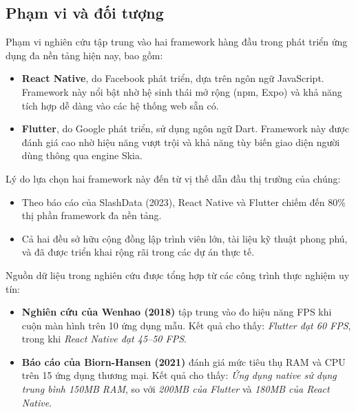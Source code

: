 \subsection{Phạm vi và đối tượng}
\renewcommand{\labelitemi}{--}    
\begin{flushleft}
    \hspace*{0.8cm}Phạm vi nghiên cứu tập trung vào hai framework hàng đầu trong phát triển ứng dụng đa nền tảng hiện nay, bao gồm:
    \setlength{\leftmargini}{1.0cm}
    \begin{itemize}
        \item \textbf{React Native}, do Facebook phát triển, dựa trên ngôn ngữ JavaScript. Framework này nổi bật nhờ hệ sinh thái mở rộng (npm, Expo) và khả năng tích hợp dễ dàng vào các hệ thống web sẵn có.

        \item \textbf{Flutter}, do Google phát triển, sử dụng ngôn ngữ Dart. Framework này được đánh giá cao nhờ hiệu năng vượt trội và khả năng tùy biến giao diện người dùng thông qua engine Skia.
    \end{itemize}
\end{flushleft}

\begin{flushleft}
    \hspace*{0.8cm}Lý do lựa chọn hai framework này đến từ vị thế dẫn đầu thị trường của chúng:
    \setlength{\leftmargini}{1.0cm}
    \begin{itemize}
        \item Theo báo cáo của SlashData (2023), React Native và Flutter chiếm đến 80\% thị phần framework đa nền tảng.
        \item Cả hai đều sở hữu cộng đồng lập trình viên lớn, tài liệu kỹ thuật phong phú, và đã được triển khai rộng rãi trong các dự án thực tế.
    \end{itemize}
\end{flushleft}

\begin{flushleft}
    \hspace*{0.8cm}Nguồn dữ liệu trong nghiên cứu được tổng hợp từ các công trình thực nghiệm uy tín:
    \setlength{\leftmargini}{1.0cm}
    \begin{itemize}
        \item \textbf{Nghiên cứu của Wenhao (2018)} tập trung vào đo hiệu năng FPS khi cuộn màn hình trên 10 ứng dụng mẫu. Kết quả cho thấy: \textit{Flutter đạt 60 FPS}, trong khi \textit{React Native đạt 45–50 FPS}.
        
        \item \textbf{Báo cáo của Biorn-Hansen (2021)} đánh giá mức tiêu thụ RAM và CPU trên 15 ứng dụng thương mại. Kết quả cho thấy: \textit{Ứng dụng native sử dụng trung bình 150MB RAM}, so với \textit{200MB của Flutter} và \textit{180MB của React Native}.
    \end{itemize}
\end{flushleft}


